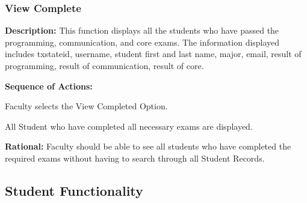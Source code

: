    \subsubsection{\large View Complete}  
   \begin{boxed} %
      \textbf{Description:}
      {\small This function displays all the students who have passed the
         programming, communication, and core exams. The information
         displayed includes txstateid, username, student first and last
         name, major, email, result of programming, result of communication,
         result of core.}
         
         \textbf{Sequence of Actions:}
         \begin{enumerate}
               {\small
            \item Faculty selects the View Completed Option.
            \item All Student who have completed all necessary exams are
               displayed.}
      \end{enumerate}

         \textbf{Rational:}
         {\small Faculty should be able to see all students who have completed the
         required exams without having to search through all Student Records.}
   \end{boxed} %


\subsection{Student Functionality}


